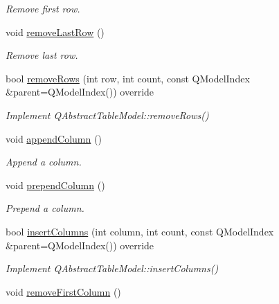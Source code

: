 \begin{DoxyCompactItemize}
\begin{DoxyCompactList}\small\item\em Remove first row. \end{DoxyCompactList}\item 
void \hyperlink{class_mdt_1_1_item_model_1_1_variant_table_model_acc6926aae3931b07c5091b900b25b00d}{remove\+Last\+Row} ()\hypertarget{class_mdt_1_1_item_model_1_1_variant_table_model_acc6926aae3931b07c5091b900b25b00d}{}\label{class_mdt_1_1_item_model_1_1_variant_table_model_acc6926aae3931b07c5091b900b25b00d}

\begin{DoxyCompactList}\small\item\em Remove last row. \end{DoxyCompactList}\item 
bool \hyperlink{class_mdt_1_1_item_model_1_1_variant_table_model_a2cb9681cc329e62d1c61fbb62c755dbe}{remove\+Rows} (int row, int count, const Q\+Model\+Index \&parent=Q\+Model\+Index()) override
\begin{DoxyCompactList}\small\item\em Implement Q\+Abstract\+Table\+Model\+::remove\+Rows() \end{DoxyCompactList}\item 
void \hyperlink{class_mdt_1_1_item_model_1_1_variant_table_model_a6ff8ca41cf00aba78e0044f70fc35d86}{append\+Column} ()\hypertarget{class_mdt_1_1_item_model_1_1_variant_table_model_a6ff8ca41cf00aba78e0044f70fc35d86}{}\label{class_mdt_1_1_item_model_1_1_variant_table_model_a6ff8ca41cf00aba78e0044f70fc35d86}

\begin{DoxyCompactList}\small\item\em Append a column. \end{DoxyCompactList}\item 
void \hyperlink{class_mdt_1_1_item_model_1_1_variant_table_model_a3b604f387fe26429ca91dc935f480746}{prepend\+Column} ()\hypertarget{class_mdt_1_1_item_model_1_1_variant_table_model_a3b604f387fe26429ca91dc935f480746}{}\label{class_mdt_1_1_item_model_1_1_variant_table_model_a3b604f387fe26429ca91dc935f480746}

\begin{DoxyCompactList}\small\item\em Prepend a column. \end{DoxyCompactList}\item 
bool \hyperlink{class_mdt_1_1_item_model_1_1_variant_table_model_a7782e835293db0671ccc7d1ea727b6d6}{insert\+Columns} (int column, int count, const Q\+Model\+Index \&parent=Q\+Model\+Index()) override
\begin{DoxyCompactList}\small\item\em Implement Q\+Abstract\+Table\+Model\+::insert\+Columns() \end{DoxyCompactList}\item 
void \hyperlink{class_mdt_1_1_item_model_1_1_variant_table_model_a12182b8cf290c8e8f534537689715a25}{remove\+First\+Column} ()\hypertarget{class_mdt_1_1_item_model_1_1_variant_table_model_a12182b8cf290c8e8f534537689715a25}{}\label{class_mdt_1_1_item_model_1_1_variant_table_model_a12182b8cf290c8e8f534537689715a25}


\end{DoxyCompactItemize}
